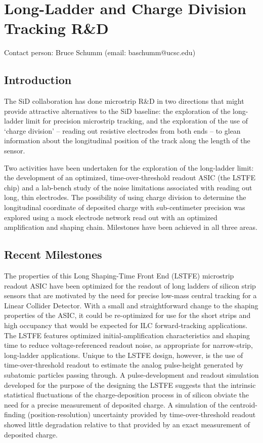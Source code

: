 
\section{Long-Ladder and Charge Division Tracking R\&D}
Contact person: Bruce Schumm (email: baschumm@ucsc.edu)
\subsection{Introduction}

The SiD collaboration has done microstrip R\&D in two directions that might provide attractive
alternatives to the SiD baseline: the exploration of the long-ladder limit for precision
microstrip tracking, and the exploration of the use of `charge division' -- reading out
resistive electrodes from both ends --
to glean information about the longitudinal position of the track
along the length of the sensor.

Two activities have been undertaken for the exploration of the long-ladder limit:
the development of an optimized, time-over-threshold readout ASIC (the LSTFE chip)
and a lab-bench study of the noise limitations associated with reading out long,
thin electrodes.
The possibility of using charge division to determine the longitudinal
coordinate of deposited charge with sub-centimeter precision was explored
using a mock electrode network read out with an optimized amplification and
shaping chain. Milestones have been achieved in all three areas.

\subsection{Recent Milestones}

The properties of this Long Shaping-Time Front End (LSTFE) microstrip readout ASIC have
been optimized for the readout of long ladders of silicon strip sensors that are motivated
by the need for precise low-mass central tracking for a Linear Collider Detector. With a
small and straightforward change to the shaping properties of the ASIC, it could be re-optimized
for use for the short strips and high occupancy that would be expected for ILC forward-tracking applications.
The LSTFE features optimized initial-amplification characteristics
and shaping time to reduce voltage-referenced readout noise, as appropriate for narrow-strip, long-ladder
applications. Unique to the LSTFE design, however, is the use of time-over-threshold readout to estimate the
analog pulse-height generated by subatomic particles passing through. A pulse-development and readout simulation developed
for the purpose of the designing the LSTFE suggests that the intrinsic statistical fluctuations of the
charge-deposition process in \unit[300]{\micron} of silicon obviate the need for a precise measurement
of deposited charge. A simulation of the centroid-finding (position-resolution) uncertainty provided by
time-over-threshold readout showed little degradation relative to that provided by an exact measurement of
deposited charge.

